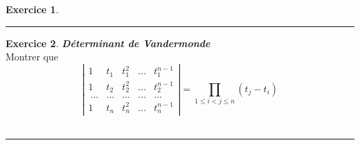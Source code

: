 \documentclass[a4paper,10pt]{article}
\theoremstyle{definition}
\theoremstyle{definition}
\newtheorem{exo}{Exercice}
\begin{document}
\begin{minipage}{1\linewidth}
\begin{minipage}[t]{0.48\linewidth}
\begin{exo}
			\centering
			\rule{1\linewidth}{0.6pt}
		\end{exo}
		
		\begin{exo} \textit{\textbf{Déterminant de Vandermonde}}\quad\\
		Montrer que
		$$\left|
		\begin{array}{ccccc}
		1 & t_1 & t_1^2 & \ldots & t_1^{n-1} \\
		1 & t_2 & t_2^2 & \ldots & t_2^{n-1} \\\
		\ldots&\ldots&\ldots& \ldots & \ldots \\
		1 & t_n & t_n^2 & \ldots & t_n^{n-1}
		\end{array}\right|
		= \prod_{1 \le i < j \le n} (t_j - t_i) $$
				\hfill\\[0.25cm]
			\centering
			\rule{1\linewidth}{0.6pt}
		\end{exo}	
		
	\end{minipage}
\end{minipage}
\end{document}
